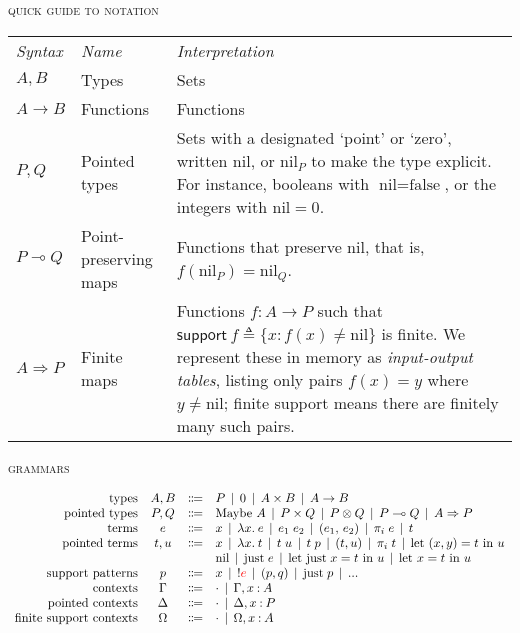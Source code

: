 \documentclass{article}
\newcommand\G\Gamma
\newcommand\D\Delta
\renewcommand\O\Omega
\newcommand\lto\multimap        %
\newcommand\fto{\Rightarrow}
\newcommand\tmaybe[1]{\ensuremath{{#1}_{*}}}
\renewcommand\tmaybe[1]{\ensuremath{\text{Maybe}~{#1}}}
\newcommand\bnfeq{\Coloneqq}
\newcommand\bnfor{\mathrel{\,|\,}}
\newcommand\emptycx{{\cdot}}
\newcommand\hyp[2]{{#1} \of {#2}}
\newcommand\of{\mathbin{:}}
\newcommand\fname\textsf        %
\newcommand\cname\text          %
\newcommand\fnspace\:           %
\newcommand\fn[1]{\lambda{#1}.\fnspace}
\newcommand\<\;                 %
\newcommand\cnil{\cname{nil}}
\newcommand\cjust{\cname{just}}
\newcommand\tnil{\cnil}
\newcommand\tjust[1]{\cjust\<{#1}}
\newcommand\letin[2]{\text{let}~{#1}~\text{in}~{#2}}
\newcommand\leteq[3]{\letin{{#1} = {#2}}{#3}}
\newcommand\letjust[3]{\leteq{\tjust {#1}}{#2}{#3}}
\newcommand\letpair[4]{\leteq{({#1}, {#2})}{#3}{#4}}
\newcommand\peq{{!}}
\begin{document}

\noindent\textsc{quick guide to notation}

\newcommand\support{\ensuremath{\fname{support}}}
\newcommand\supportof[1]{\ensuremath{\support~{#1}}}
\newcommand\defeq{\triangleq}

\begin{tabular}{llp{10cm}}%
  \it Syntax & \it Name & \it Interpretation\\
  $A,B$ & Types & Sets\\
  $A \to B$ & Functions & Functions\\
  $P,Q$ & Pointed types & Sets with a designated `point' or `zero', written $\tnil$, or $\tnil_P$ to make the type explicit.
  For instance, booleans with $\tnil = \text{false}$, or the integers with $\tnil = 0$.
  \\
  $P \lto Q$ & Point-preserving maps & Functions that preserve $\tnil$, that is, $f(\tnil_P) = \tnil_Q$.
  \\
  $A \fto P$ & Finite maps &
  Functions $f : A \to P$ such that $\supportof{f} \defeq \{ x : f(x) \ne \tnil \}$ is finite.
  We represent these in memory as \emph{input-output tables}, listing only pairs $f(x) = y$ where $y \ne \tnil$; finite support means there are finitely many such pairs.
\end{tabular}


\noindent
\textsc{grammars}

\[
\begin{array}{rccl}
  \text{types} & A,B &\bnfeq&
  P \bnfor 0 \bnfor A \times B \bnfor A \to B
  \\
  \text{pointed types} & P,Q &\bnfeq&
  \tmaybe A \bnfor P \times Q \bnfor P \otimes Q
  \bnfor P \lto Q
  \bnfor A \fto P
  \\
  \text{terms} & e &\bnfeq& x \bnfor \fn{x} e \bnfor e_1\<e_2
  \bnfor (e_1,\, e_2) \bnfor \pi_i \<e \bnfor t
  \\
  \text{pointed terms} & t,u &\bnfeq&
  x \bnfor \fn{x} t \bnfor t \< u \bnfor t \< p
  \bnfor (t,u) \bnfor \pi_i \<t \bnfor \letpair{x}{y}{t}{u}
  \\
  &&&
  \tnil \bnfor \tjust e
  \bnfor \letjust x t u         %
  \bnfor \leteq x t u
  \\
  \text{support patterns} & p &\bnfeq& x
  \bnfor \peq {\color{red} e}   %
  \bnfor (p,q) \bnfor \tjust p \bnfor ...
  \\
  \text{contexts} & \G &\bnfeq& \emptycx \bnfor \G, \hyp x A
  \\
  \text{pointed contexts} & \D &\bnfeq& \emptycx \bnfor \D, \hyp x P
  \\
  \text{finite support contexts} & \O &\bnfeq& \emptycx \bnfor \O, \hyp x A
  \\
\end{array}
\]
\end{document}
